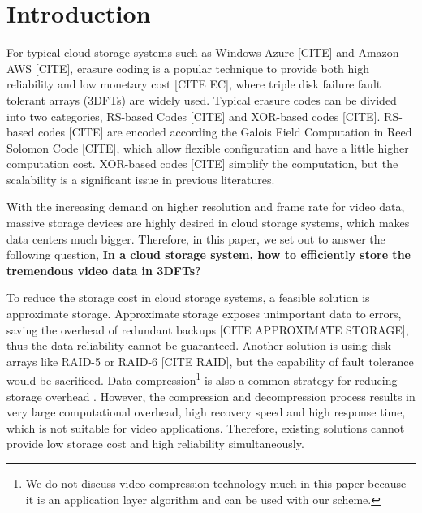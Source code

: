 \documentclass[sigconf]{acmart}
\begin{document}
%
%

\maketitle

\section{Introduction}
For typical cloud storage systems such as Windows Azure [CITE] and Amazon AWS [CITE], erasure coding is a popular technique to provide both high reliability and low monetary cost [CITE EC], where triple disk failure fault tolerant arrays (3DFTs) are widely used. Typical erasure codes can be divided into two categories, RS-based Codes [CITE] and XOR-based codes [CITE]. RS-based codes [CITE] are encoded according the Galois Field Computation in Reed Solomon Code [CITE], which allow flexible configuration and have a little higher computation cost. XOR-based codes [CITE] simplify the computation, but the scalability is a significant issue in previous literatures.

With the increasing demand on higher resolution and frame rate for video data, massive storage devices are highly desired in cloud storage systems, which makes data centers much bigger.
Therefore, in this paper, we set out to answer the following question,
\textbf{In a cloud storage system, how to efficiently store the tremendous video data in 3DFTs?}


To reduce the storage cost in cloud storage systems, a feasible solution is approximate storage. Approximate storage exposes unimportant data to errors, saving the overhead of redundant backups [CITE APPROXIMATE STORAGE], thus the data reliability cannot be guaranteed. 
Another solution is using disk arrays like RAID-5 or RAID-6 [CITE RAID], but the capability of fault tolerance would be sacrificed.
Data compression\footnote{We do not discuss video compression technology much in this paper because it is an application layer algorithm and can be used with our scheme.} is also a common strategy for reducing storage overhead \cite{ziv1977universal} \cite{ziv1978compression} \cite{deutsch1996deflate}. However, the compression and decompression process results in very large computational overhead, high recovery speed and high response time, which is not suitable for video applications.
Therefore, existing solutions cannot provide low storage cost and high reliability simultaneously.
\end{document}
